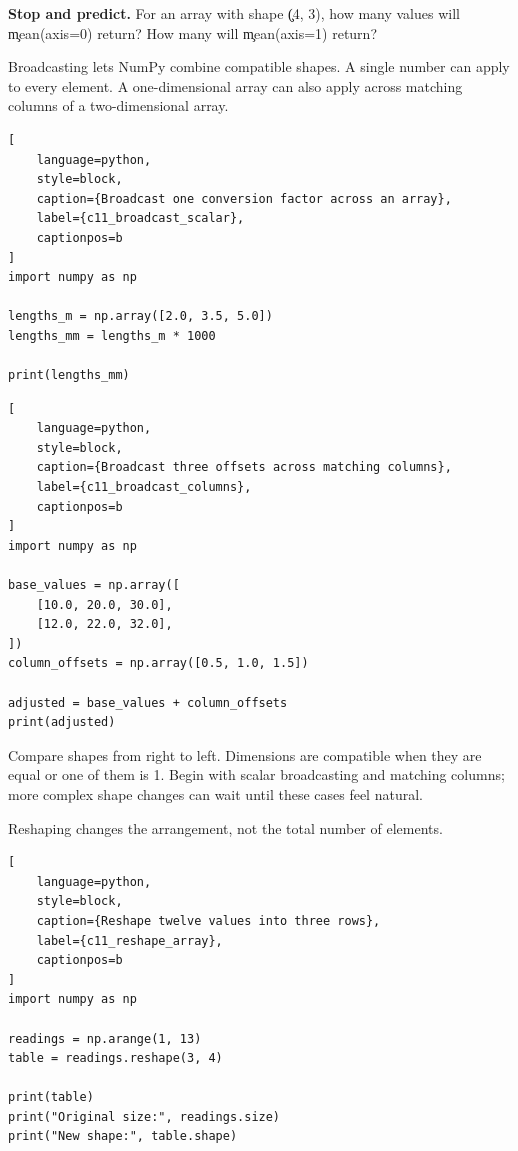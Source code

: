 \begin{NoteBox}
\textbf{Stop and predict.} For an array with shape \c{(4, 3)}, how many values
will \c{mean(axis=0)} return? How many will \c{mean(axis=1)} return?
\end{NoteBox}


Broadcasting lets NumPy combine compatible shapes. A single number can apply
to every element. A one-dimensional array can also apply across matching
columns of a two-dimensional array.

\begin{lstlisting}[
    language=python,
    style=block,
    caption={Broadcast one conversion factor across an array},
    label={c11_broadcast_scalar},
    captionpos=b
]
import numpy as np

lengths_m = np.array([2.0, 3.5, 5.0])
lengths_mm = lengths_m * 1000

print(lengths_mm)
\end{lstlisting}

\begin{lstlisting}[
    language=python,
    style=block,
    caption={Broadcast three offsets across matching columns},
    label={c11_broadcast_columns},
    captionpos=b
]
import numpy as np

base_values = np.array([
    [10.0, 20.0, 30.0],
    [12.0, 22.0, 32.0],
])
column_offsets = np.array([0.5, 1.0, 1.5])

adjusted = base_values + column_offsets
print(adjusted)
\end{lstlisting}

Compare shapes from right to left. Dimensions are compatible when they are
equal or one of them is 1. Begin with scalar broadcasting and matching columns;
more complex shape changes can wait until these cases feel natural.


Reshaping changes the arrangement, not the total number of elements.

\begin{lstlisting}[
    language=python,
    style=block,
    caption={Reshape twelve values into three rows},
    label={c11_reshape_array},
    captionpos=b
]
import numpy as np

readings = np.arange(1, 13)
table = readings.reshape(3, 4)

print(table)
print("Original size:", readings.size)
print("New shape:", table.shape)
\end{lstlisting}

